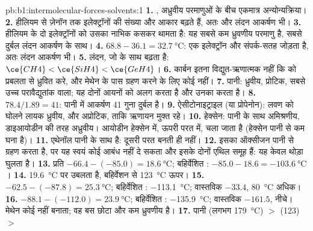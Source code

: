 \begin{solution}{pb:b1:intermolecular-forces-solvents:1}
\textbf{1.} , अध्रुवीय परमाणुओं के बीच एकमात्र अन्योन्यक्रिया।
\textbf{2.} हीलियम से ज़ेनॉन तक इलेक्ट्रॉनों की संख्या और आकार बढ़ते हैं,
अतः  और लंदन आकर्षण भी।
\textbf{3.} हीलियम के दो इलेक्ट्रॉनों को उसका नाभिक कसकर थामता है: यह
सबसे कम ध्रुवणीय परमाणु है, सबसे दुर्बल लंदन आकर्षण के साथ।
\textbf{4.} $68.8 - 36.1 = \qty{32.7}{\celsius}$: एक 
इलेक्ट्रॉन और संपर्क-सतह जोड़ता है, अतः लंदन आकर्षण भी।
\textbf{5.} लंदन, जो  के साथ बढ़ता है: $\ce{CH4} < \ce{SiH4} <
\ce{GeH4}$।
\textbf{6.} कार्बन इतना विद्युत-ऋणात्मक नहीं कि  को
प्रबलता से ध्रुवित करे, और मेथेन के पास  ग्रहण करने के लिए कोई  नहीं।
\textbf{7.} पानी: ध्रुवीय, प्रोटिक, सबसे उच्च परावैद्युतांक वाला; यह
दोनों आयनों को अलग करता है और उनका  करता है।
\textbf{8.} $78.4/1.89 = 41$: पानी में आकर्षण 41 गुना दुर्बल है।
\textbf{9.} ऐसीटोनाइट्राइल (या प्रोपेनोन): लवण को घोलने लायक ध्रुवीय,
और अप्रोटिक, ताकि ऋणायन मुक्त रहे।
\textbf{10.} हेक्सेन: पानी के साथ अमिश्रणीय, डाइआयोडीन की तरह अध्रुवीय। आयोडीन
हेक्सेन में, ऊपरी परत में, चला जाता है (हेक्सेन पानी से कम घना है)।
\textbf{11.} एथेनॉल पानी के साथ  है: दूसरी परत बनती ही नहीं।
\textbf{12.} इसका ऑक्सीजन पानी से  ग्रहण करता है, पर यह स्वयं
कोई आबंध नहीं दे सकता और इसके दोनों एथिल समूह  हैं: यह केवल
थोड़ा घुलता है।
\textbf{13.} प्रति  $-66.4 - (-85.0) = \qty{18.6}{\celsius}$;
बहिर्वेशित : $-85.0 - 18.6 = \qty{-103.6}{\celsius}$।
\textbf{14.}  \qty{19.6}{\celsius} पर उबलता है, बहिर्वेशन से
\qty{123}{\celsius} ऊपर।
\textbf{15.} $-62.5 - (-87.8) = \qty{25.3}{\celsius}$; बहिर्वेशित
: \qty{-113.1}{\celsius}; वास्तविक $-33.4$, \qty{80}{\celsius}
अधिक।
\textbf{16.} $-88.1 - (-112.0) = \qty{23.9}{\celsius}$; बहिर्वेशित
: \qty{-135.9}{\celsius}; वास्तविक $-161.5$, नीचे। मेथेन कोई
 नहीं बनाता; वह बस छोटा और कम ध्रुवणीय है।
\textbf{17.} पानी (लगभग \qty{179}{\celsius}) $>$  (123) $>$

\end{solution}
